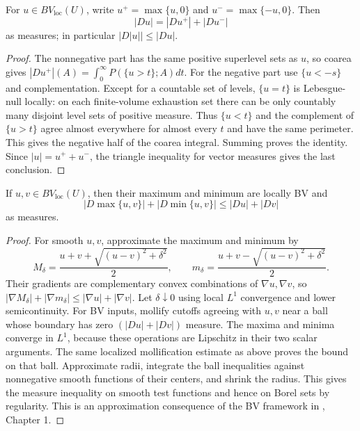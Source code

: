\begin{corollary}\label{cor:bv-positive-negative}
For $u\in BV_{\mathrm{loc}}(U)$, write $u^+=\max\{u,0\}$ and $u^-=\max\{-u,0\}$. Then
\[
 |Du|=|Du^+|+|Du^-|
\]
as measures; in particular $|D|u||\leq|Du|$.
\end{corollary}
\begin{proof}
The nonnegative part has the same positive superlevel sets as $u$, so coarea gives $|Du^+|(A)=\int_0^\infty P(\{u>t\};A)dt$. For the negative part use $\{u<-s\}$ and complementation. Except for a countable set of levels, $\{u=t\}$ is Lebesgue-null locally: on each finite-volume exhaustion set there can be only countably many disjoint level sets of positive measure. Thus $\{u<t\}$ and the complement of $\{u>t\}$ agree almost everywhere for almost every $t$ and have the same perimeter. This gives the negative half of the coarea integral. Summing proves the identity. Since $|u|=u^++u^-$, the triangle inequality for vector measures gives the last conclusion.
\end{proof}

\begin{proposition}\label{prop:bv-lattice}
If $u,v\in BV_{\mathrm{loc}}(U)$, then their maximum and minimum are locally BV and
\[
 |D\max\{u,v\}|+|D\min\{u,v\}|\leq|Du|+|Dv|
\]
as measures.
\end{proposition}
\begin{proof}
For smooth $u,v$, approximate the maximum and minimum by
\[
 M_\delta=\frac{u+v+\sqrt{(u-v)^2+\delta^2}}2,
 \qquad m_\delta=\frac{u+v-\sqrt{(u-v)^2+\delta^2}}2.
\]
Their gradients are complementary convex combinations of $\nabla u,\nabla v$, so
$|\nabla M_\delta|+|\nabla m_\delta|\leq|\nabla u|+|\nabla v|$. Let $\delta\downarrow0$ using local $L^1$ convergence and lower semicontinuity. For BV inputs, mollify cutoffs agreeing with $u,v$ near a ball whose boundary has zero $(|Du|+|Dv|)$ measure. The maxima and minima converge in $L^1$, because these operations are Lipschitz in their two scalar arguments. The same localized mollification estimate as above proves the bound on that ball. Approximate radii, integrate the ball inequalities against nonnegative smooth functions of their centers, and shrink the radius. This gives the measure inequality on smooth test functions and hence on Borel sets by regularity. This is an approximation consequence of the BV framework in \cite{Giu84}, Chapter 1.
\end{proof}

